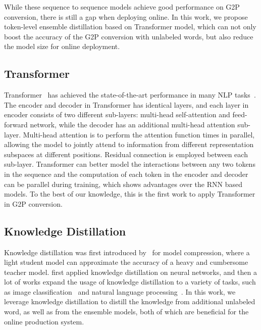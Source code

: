 \documentclass[a4paper]{article}
\begin{document}
While these sequence to sequence models achieve good performance on G2P conversion, there is still a gap when deploying online. In this work, we propose token-level ensemble distillation based on Transformer model, which can not only boost the accuracy of the G2P conversion with unlabeled words, but also reduce the model size for online deployment. 


\subsection{Transformer}

Transformer~\cite{vaswani2017attention} has achieved the state-of-the-art performance in many NLP tasks~\cite{devlin2018bert,dehghani2018universal,wangperawong2018attending,so2019evolved}. The encoder and decoder in Transformer has  identical layers, and each layer in encoder consists of two different sub-layers: multi-head self-attention and feed-forward network, while the decoder has an additional multi-head attention sub-layer. Multi-head attention is to perform the attention function  times in parallel, allowing the model to jointly attend to information from different representation subspaces at different positions. Residual connection is employed between each sub-layer. Transformer can better model the interactions between any two tokens in the sequence and the computation of each token in the encoder and decoder can be parallel during training, which shows advantages over the RNN based models. To the best of our knowledge, this is the first work to apply Transformer in G2P conversion.

\subsection{Knowledge Distillation}
Knowledge distillation was first introduced by~\cite{buciluǎ2006model}  for model compression, where a light student model can approximate the accuracy of a heavy and cumbersome teacher model. \cite{hinton2015distilling} first applied knowledge distillation on neural networks, and then a lot of works expand the usage of knowledge distillation to a variety of tasks, such as image classification~\cite{furlanello2018born,anil2018large,yang2018knowledge} and natural language processing~\cite{kim2016sequence,freitag2017ensemble,tan2018multilingual}. In this work, we leverage knowledge distillation to distill the knowledge from additional unlabeled word, as well as from the ensemble models, both of which are beneficial for the online production system.  
\end{document}
